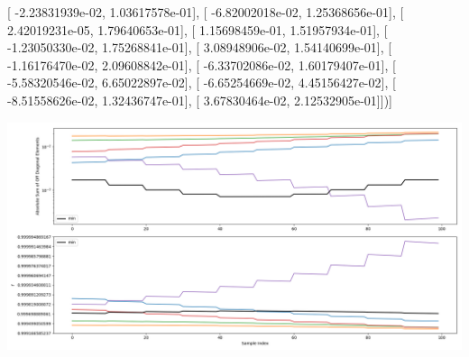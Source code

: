 \documentclass{article}
\begin{document}
       [ -2.23831939e-02,   1.03617578e-01],
       [ -6.82002018e-02,   1.25368656e-01],
       [  2.42019231e-05,   1.79640653e-01],
       [  1.15698459e-01,   1.51957934e-01],
       [ -1.23050330e-02,   1.75268841e-01],
       [  3.08948906e-02,   1.54140699e-01],
       [ -1.16176470e-02,   2.09608842e-01],
       [ -6.33702086e-02,   1.60179407e-01],
       [ -5.58320546e-02,   6.65022897e-02],
       [ -6.65254669e-02,   4.45156427e-02],
       [ -8.51558626e-02,   1.32436747e-01],
       [  3.67830464e-02,   2.12532905e-01]])]
\begin{center}
\includegraphics[scale=.9]{report_pickled_controls144/control_dpn_all.png}

\end{center}
\end{document}
